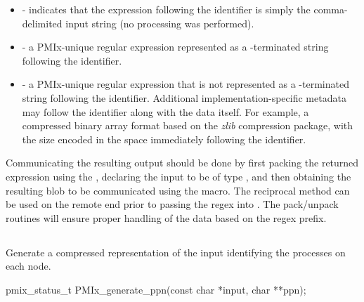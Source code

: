\begin{itemize}
    \item {} - indicates that the expression following the identifier is simply the comma-delimited input string (no processing was performed).
    \item {} - a \ac{PMIx}-unique regular expression represented as a -terminated string following the identifier.
    \item {} - a \ac{PMIx}-unique regular expression that is not represented as a -terminated string following the identifier. Additional implementation-specific metadata may follow the identifier along with the data itself. For example, a compressed binary array format based on the \emph{zlib} compression package, with the size encoded in the space immediately following the identifier.
\end{itemize}

Communicating the resulting output should be done by first packing the returned expression using the , declaring the input to be of type , and then obtaining the resulting blob to be communicated using the  macro. The reciprocal method can be used on the remote end prior to passing the regex into . The pack/unpack routines will ensure proper handling of the data based on the regex prefix.


\subsection{}

\summary

Generate a compressed representation of the input identifying the processes on each node.

\format

\cspecificstart
\begin{codepar}
pmix_status_t
PMIx_generate_ppn(const char *input, char **ppn);
\end{codepar}
\cspecificend

\begin{arglist}
\end{arglist}

